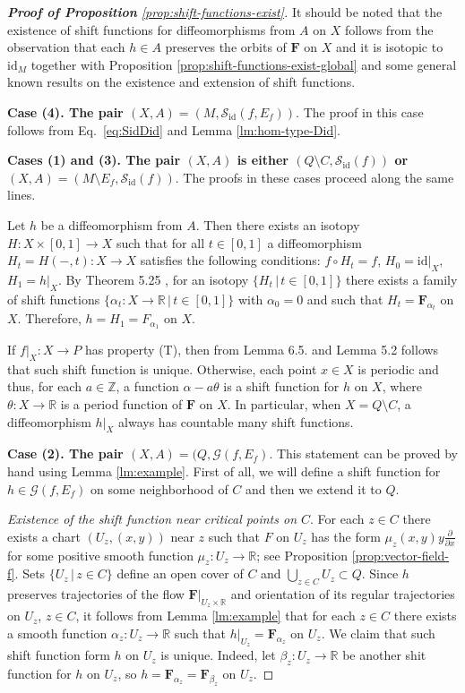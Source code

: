 \documentclass[10pt,reqno]{amsart}
\newcommand{\bbR}{\mathbb{R}}
\newcommand{\bbZ}{\mathbb{Z}}
\newcommand{\bfF}{\mathbf{F}}
\newcommand{\id}{\mathrm{id}}
\begin{document}
{
\begin{proof}[{\bf Proof of Proposition} {\rm\ref{prop:shift-functions-exist}}]
	 It should be noted that the existence of shift functions for diffeomorphisms from $A$ on $X$ follows from the observation that each $h\in A$ preserves the orbits of $\bfF$ on $X$	and it is isotopic to $\id_M$ together with Proposition \ref{prop:shift-functions-exist-global} and  some general known results on the existence and extension of shift functions. 
	 
	 
	 {\bf Case {\rm (4)}. The pair $(X,A) =  (M,\mathcal{S}_{\id}(f,E_f))$}. The proof in this case follows from Eq.~\eqref{eq:SidDid} and Lemma \ref{lm:hom-type-Did}.
	
	{\bf Cases {\rm (1)} and {\rm (3)}. The pair $(X,A)$ is either $(Q\setminus C,\mathcal{S}_{\id}(f))$ or $(X,A) = (M\setminus E_f, \mathcal{S}_{\id}(f))$}. The proofs in these cases proceed along the same lines.
	
	Let $h$ be a diffeomorphism from $A$. Then there exists an isotopy $H:X\times[0,1]\to X$ such that for all $t\in [0,1]$ a diffeomorphism $H_t = H(-,t):X\to X$ satisfies the following conditions: $f\circ H_t = f$, $H_0 = \id|_{X},$ $H_1 = h|_{X}$. By Theorem 5.25 \cite{Maksymenko:Indiana:2010}, for an isotopy $\{H_t\,|\, t\in [0,1]\}$ there exists a family of shift functions $\{\alpha_t:X\to \bbR\,|\, t\in [0,1]\}$ with $\alpha_0 = 0$ and such that $H_t = \bfF_{\alpha_t}$ on $X$. Therefore, $h = H_1 = F_{\alpha_1}$ on $X$.
	
	If $f|_{X}:X\to P$ has property (T), then from  Lemma 6.5. \cite{Maksymenko:DefFuncI:2014} and Lemma 5.2 \cite{Maksymenko:NKolyv:2009} follows that such shift function is unique.  Otherwise, each point $x\in X$ is periodic and thus, for each $a\in\bbZ$, a function $\alpha - a\theta$ is a shift function for $h$ on $X$, where $\theta:X\to \bbR$ is a period function of $\bfF$ on $X$. In particular, when $X = Q\setminus C$, a diffeomorphism $h|_{X}$ always has  countable many shift functions.
	
	{\bf Case {\rm (2)}. The pair $(X,A) =  (Q,\mathcal{G}(f,E_f)$}.
	 This statement can  be proved by hand using Lemma \ref{lm:example}.
	 First of all, we will define a shift function for $h\in\mathcal{G}(f,E_f)$ on some neighborhood of $C$ and then we extend it to $Q$.
	 
	 {\it Existence of the shift function near critical points on $C$}.
	 For each $z\in C$ there exists a chart $(U_z, (x,y))$ near $z$ such that $F$ on $U_z$ has the form $\mu_z(x,y) y \frac{\partial}{\partial x}$ for some positive smooth function $\mu_z:U_z\to \bbR$; see Proposition \ref{prop:vector-field-f}.  Sets $\{U_z\,|\, z\in C\}$ define an open cover of $C$ and $\bigcup_{z\in C}U_z\subset Q$.
	 Since $h$  preserves trajectories of the flow $\bfF|_{U_z\times \bbR}$  and
	 orientation of its regular trajectories on $U_z$, $z\in C$, it follows from 
	 Lemma \ref{lm:example} that for  each $z\in C$ there exists a smooth function $\alpha_z:U_{z}\to \bbR$ such that $h|_{U_{z}} = \bfF_{\alpha_z}$ on $U_{z}$.
	We claim that such shift function form $h$ on $U_z$ is unique. Indeed, let $\beta_z:U_z\to \bbR$ be another shit function for $h$ on $U_z$, so $h = \bfF_{\alpha_z} = \bfF_{\beta_z}$ on $U_z.$ 
	

\end{proof}}
\end{document}
